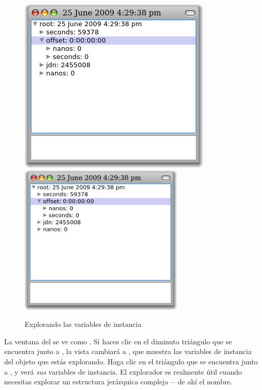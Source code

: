 \documentclass[spanish,a4paper,10pt,twoside]{book}
\begin{document}
\begin{figure}[tbp]
\begin{minipage}{0.48\textwidth}
\begin{center}
		{\includegraphics[width=\textwidth]{exploreTimeStampNow2}}
		{\includegraphics[width=0.7\textwidth]{exploreTimeStampNow2}}
	\end{center}
	\caption{Explorando las variables de instancia}
\end{minipage}
\end{figure}

La ventana del  se ve como .
Si haces clic en el diminuto tri\'angulo que se encuentra junto a , la vista cambiar\'a a  , que muestra las variables de instancia del objeto que est\'as explorando.
Haga clic en el tri\'angulo que se encuentra junto a , y ver\'a \emph{sus} variables de instancia.
El explorador es realmente \'util cuando necesitas explorar un estructura jer\'arquica compleja\,---\,de ah\'i el nombre.
\end{document}
